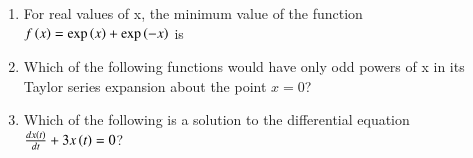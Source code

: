 \documentclass[a4paper, 11pt]{article}
\begin{document}
\begin{enumerate}
    \hfill{}

    \item For real values of x, the minimum value of the function $f\left(x\right)=\exp\left(x\right)+\exp\left(-x\right)$ is
    
    \begin{enumerate}
    \end{enumerate}
    
    \hfill{}

    \item Which of the following functions would have only odd powers of x in its Taylor series expansion about the point $x=0$?
    
    \begin{enumerate}
    \end{enumerate}
    
    \hfill{}

    \item Which of the following is a solution to the differential equation $\frac{dx\left(t\right)}{dt}+3x\left(t\right)=0$?
    
    \begin{enumerate}
    \end{enumerate}
    

\end{enumerate}
\end{document}
